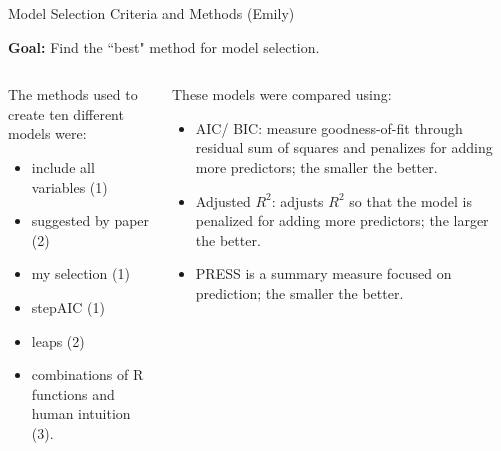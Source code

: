 \documentclass[table]{beamer}\usepackage[]{graphicx}\usepackage[]{color}
\begin{document}
\begin{frame}{Model Selection Criteria and Methods (Emily)}

\begin{center}
\textbf{Goal:} Find the ``best" method for model selection.\\
\end{center}

\begin{columns}[c] %
\begin{column}[c]{5cm} %
The methods used to create ten different models were:
\begin{itemize}
\item include all variables (1)\\
\item suggested by paper (2)\\
\item my selection (1)\\
\item stepAIC (1) \\
\item leaps (2) \\
\item combinations of R functions and human intuition (3).  \\
\end{itemize}

\end{column}

\begin{column}[c]{7cm} 

These models were compared using: \\
\begin{itemize}
\item AIC/ BIC: measure goodness-of-fit through residual sum of squares and penalizes for adding more predictors; the smaller the better.\\
\item Adjusted $R^2$: adjusts $R^2$ so that the model is penalized for adding more predictors; the larger the better. \\
\item PRESS is a summary measure focused on prediction; the smaller the better.\\
\end{itemize}
\end{column}
\end{columns}

\end{frame}
\end{document}
